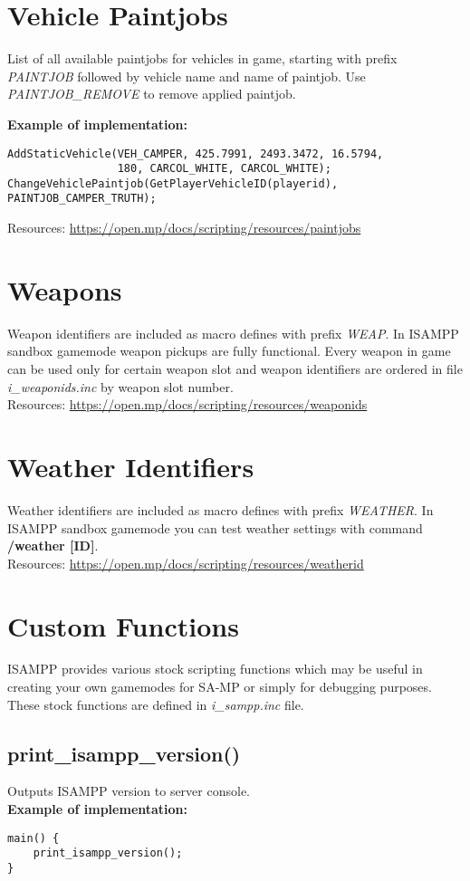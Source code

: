 \documentclass{article}
\begin{document}
\section{Vehicle Paintjobs}
\begin{sloppypar}
List of all available paintjobs for vehicles in game, starting with prefix \textit{PAINTJOB} followed by vehicle name and name of paintjob. Use \textit{PAINTJOB\_REMOVE} to remove applied paintjob.
\end{sloppypar}
\bigskip
\noindent \textbf{Example of implementation:}
\begin{verbatim}
AddStaticVehicle(VEH_CAMPER, 425.7991, 2493.3472, 16.5794,
                 180, CARCOL_WHITE, CARCOL_WHITE);
ChangeVehiclePaintjob(GetPlayerVehicleID(playerid), PAINTJOB_CAMPER_TRUTH);
\end{verbatim}
\bigskip
Resources: \url{https://open.mp/docs/scripting/resources/paintjobs}

\section{Weapons}
Weapon identifiers are included as macro defines with prefix \textit{WEAP}. In ISAMPP sandbox gamemode weapon pickups are fully functional. Every weapon in game can be used only for certain weapon slot and weapon identifiers are ordered in file \textit{i\_weaponids.inc} by weapon slot number.
\bigskip
\\Resources: \url{https://open.mp/docs/scripting/resources/weaponids}

\section{Weather Identifiers}
Weather identifiers are included as macro defines with prefix \textit{WEATHER}. In ISAMPP sandbox gamemode you can test weather settings with command \textbf{/weather [ID]}.
\bigskip
\\Resources: \url{https://open.mp/docs/scripting/resources/weatherid}


\newpage
\section{Custom Functions}
ISAMPP provides various stock scripting functions which may be useful in creating your own gamemodes for SA-MP or simply for debugging purposes. These stock functions are defined in \textit{i\_sampp.inc} file.

\subsection{print\_isampp\_version()}
Outputs ISAMPP version to server console.
\bigskip
\\\textbf{Example of implementation:}
\begin{verbatim}
main() {
    print_isampp_version();
}
\end{verbatim}
\end{document}
